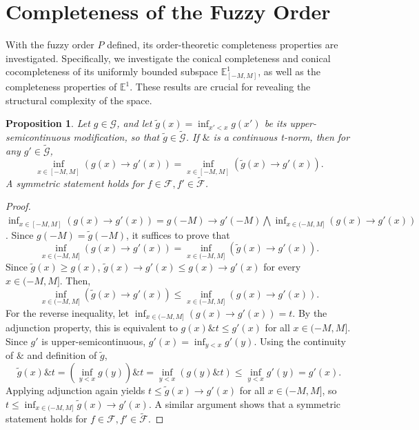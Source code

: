 \documentclass[preprint,3p,times]{elsarticle}
\theoremstyle{plain}
\newtheorem{prop}[thm]{Proposition}
\theoremstyle{definition}
\numberwithin{equation}{section}
\begin{document}
\section{Completeness of the Fuzzy Order}
With the fuzzy order \(P\) defined, its order-theoretic completeness properties are investigated. Specifically, we investigate the conical completeness and conical cocompleteness of its uniformly bounded subspace \(\mathbb{E}^1_{[-M,M]}\), as well as the completeness properties of \(\mathbb{E}^1\). These results are crucial for revealing the structural complexity of the space. 
\begin{prop}\label{upper-semicontinuous except for countable point eq}
Let \(g\in\mathcal{G}\), and let \(\widetilde{g}(x)=\inf_{x'<x}g(x')\) be its upper-semicontinuous modification, so that \(\widetilde{g}\in\mathcal{\widetilde{G}}\). If $\&$ is a continuous t-norm, then for any \( g' \in \mathcal{\widetilde{G}} \), 
\[
\inf_{x \in [-M,M]} (g(x) \rightarrow g'(x)) = \inf_{x \in [-M,M]} (\widetilde{g}(x) \rightarrow g'(x)).
\]
A symmetric statement holds for \( f\in \mathcal{F}, f'\in \mathcal{\widetilde{F}}\).
\end{prop}
  \begin{proof}
  $\inf_{x \in [-M,M]} (g(x) \rightarrow g'(x))=g(-M) \rightarrow g'(-M) \bigwedge \inf_{x\in (-M,M]} (g(x) \rightarrow g'(x))$. Since $g(-M)=\widetilde{g}(-M)$, it suffices to prove that
   \[
 \inf_{x \in (-M,M]} (g(x) \rightarrow g'(x)) = \inf_{x \in (-M,M]} (\widetilde{g}(x) \rightarrow g'(x)).
  \]
 Since $\widetilde{g}(x)\ge g(x)$,  $ \widetilde{g}(x)\rightarrow g'(x)\le g(x)\rightarrow g'(x)$ for every $x\in (-M,M]$. Then, \[
  \inf_{x \in (-M,M]} (\widetilde {g}(x) \rightarrow g'(x))\le  \inf_{x \in (-M,M]} (g(x) \rightarrow g'(x)).
 \]
 For the reverse inequality, let $ \inf_{x \in (-M,M]} (g(x) \rightarrow g'(x))=t$. By the adjunction property, this is equivalent to \( g(x) \& t \leq g'(x) \) for all \( x \in(-M,M]\). Since \( g '\) is upper-semicontinuous, \( g'(x) = \inf_{y < x} g'(y) \). Using the continuity of \( \& \) and definition of \( \widetilde{g}\),
 \[
 \widetilde{g}(x) \& t = \left( \inf_{y < x} g(y) \right) \& t = \inf_{y < x} (g(y) \& t) \leq \inf_{y < x} g'(y)=g'(x).
 \]
 Applying adjunction again yields \( t \leq \widetilde{g}(x)\rightarrow g'(x) \) for all \( x \in (-M,M]\), so \( t \leq \inf_{x\in(-M,M]} \widetilde{g}(x)\rightarrow g'(x) \). A similar argument shows that a symmetric statement holds for \( f \in \mathcal{F}, f' \in \mathcal{\widetilde{F}} \). 
 \end{proof}
\end{document}
